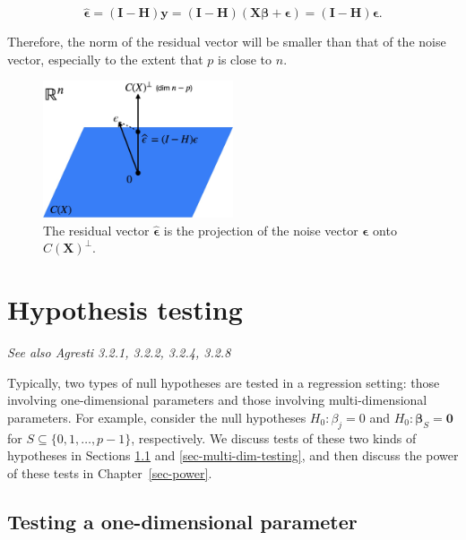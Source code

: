 \documentclass[
  11pt,
  letterpaper,
  oneside]{book}
\theoremstyle{plain}
\theoremstyle{plain}
\theoremstyle{definition}
\theoremstyle{definition}
\theoremstyle{plain}
\theoremstyle{remark}
\begin{document}
\[
\boldsymbol{\widehat{\epsilon}} = (\boldsymbol{I} - \boldsymbol{H})\boldsymbol{y} = (\boldsymbol{I} - \boldsymbol{H})(\boldsymbol{X} \boldsymbol{\beta} + \boldsymbol{\epsilon}) = (\boldsymbol{I} - \boldsymbol{H})\boldsymbol{\epsilon}.
\]

Therefore, the norm of the residual vector will be smaller than that of
the noise vector, especially to the extent that \(p\) is close to \(n\).

\begin{figure}

{\centering \includegraphics[width=0.5\textwidth,height=\textheight]{figures/residuals-as-noise-projection.jpg}

}

\caption{\label{fig-residuals-as-noise-projection}The residual vector
\(\boldsymbol{\widehat{\epsilon}}\) is the projection of the noise
vector \(\boldsymbol{\epsilon}\) onto \(C(\boldsymbol{X})^\perp\).}

\end{figure}

\hypertarget{sec-hypothesis-testing-chapter}{%
\chapter{Hypothesis testing}\label{sec-hypothesis-testing-chapter}}

\emph{See also Agresti 3.2.1, 3.2.2, 3.2.4, 3.2.8}

Typically, two types of null hypotheses are tested in a regression
setting: those involving one-dimensional parameters and those involving
multi-dimensional parameters. For example, consider the null hypotheses
\(H_0: \beta_j = 0\) and \(H_0: \boldsymbol{\beta}_S = \boldsymbol{0}\)
for \(S \subseteq \{0, 1, \dots, p-1\}\), respectively. We discuss tests
of these two kinds of hypotheses in Sections \ref{sec-one-dim-testing}
and \ref{sec-multi-dim-testing}, and then discuss the power of these
tests in Chapter~\ref{sec-power}.

\hypertarget{sec-one-dim-testing}{%
\section{Testing a one-dimensional
parameter}\label{sec-one-dim-testing}}
\end{document}
